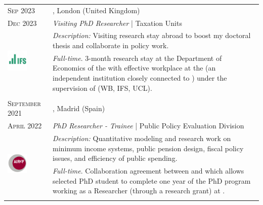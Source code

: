 \begin{longtable}{R{2.5cm}|p{14.8cm}}
	\textsc{Sep 2023} & \textsc{}, \faMapMarker \hspace{0.5 mm} London (United Kingdom) \\
 	\textsc{Dec 2023} 	& \textit{Visiting PhD Researcher} | Taxation Units \\
	 & 
	\footnotesize{\faTasks \emph{ Description: }Visiting research stay abroad to boost my doctoral thesis and collaborate in policy work.} \\ &
	\footnotesize{\faFileText \emph{ Full-time}. 3-month research stay at the Department of Economics of the  with effective workplace at the  (an independent institution closely connected to ) under the supervision of  (WB, IFS, UCL).}\\
 	 \\

 	\textsc{September 2021} & \textsc{}, \faMapMarker \hspace{0.5 mm} Madrid (Spain) \\
 	\textsc{April 2022} 	& \textit{PhD Researcher - Trainee} | Public Policy Evaluation Division\\
	 & 
	\footnotesize{\faTasks \emph{ Description: }Quantitative modeling and research work on minimum income systems, public pension design, fiscal policy issues, and efficiency of public spending.} \\ &
	\footnotesize{\faFileText \emph{ Full-time}. Collaboration agreement between  \hspace{0.5 mm} and  which allows selected PhD student to complete one year of the PhD program working as a Researcher (through a research grant) at .}\\
 	 \\
 

\end{longtable}
